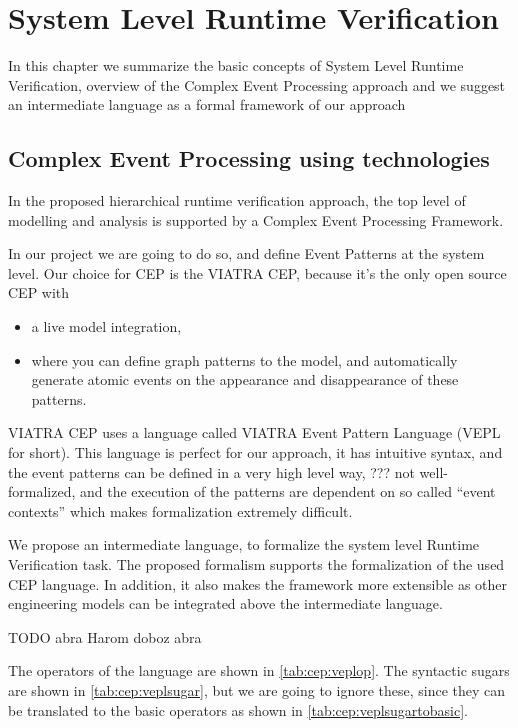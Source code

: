 \chapter{System Level Runtime Verification}
	\label{chap:cep}
		In this chapter we summarize the basic concepts of System Level Runtime Verification,
		overview of the Complex Event Processing approach and we suggest an intermediate language as a formal framework of our approach
	
	\section{Complex Event Processing using technologies}
	
	
	
		In the proposed hierarchical runtime verification approach, the top level of modelling and analysis is supported by a Complex Event Processing Framework.
		
		In our project we are going to do so, and define Event Patterns at the system level.
		Our choice for CEP is the VIATRA CEP, because it's the only open source CEP with 
		\begin{itemize}
			\item a live model integration, 
			\item where you can define graph patterns to the model, and automatically generate atomic events on the appearance and disappearance of these patterns.
		\end{itemize}
		
		
		VIATRA CEP uses a language called VIATRA Event Pattern Language (VEPL for short).
		This language is perfect for our approach, it has intuitive syntax, and the event patterns can be defined in
		a very high level way, ??? not well-formalized, and the
		execution of the patterns are dependent on so called ``event contexts'' which makes formalization extremely difficult.
		
		We propose an intermediate language, to formalize the system level Runtime Verification task.
		The proposed formalism supports the formalization of the used CEP language.
		In addition, it also makes the framework more extensible as other engineering models can be integrated above the intermediate language.
		
		TODO abra Harom doboz abra
		
		
		The operators of the language are shown in \cref{tab:cep:veplop}. 
		The syntactic sugars are shown in \cref{tab:cep:veplsugar},
		but we are going to ignore these, since they can be translated to the basic operators as shown in \cref{tab:cep:veplsugartobasic}.
		
